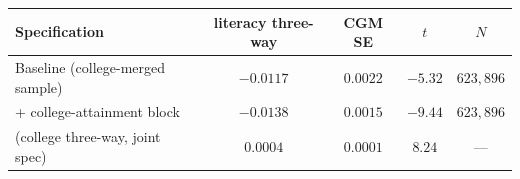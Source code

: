 \begin{tabular}{lcccc}
\hline\hline
Specification & literacy three-way & CGM SE & $t$ & $N$ \\
\hline
Baseline (college-merged sample) & $-0.0117$ & $0.0022$ & $-5.32$ & $623,896$ \\
\quad + college-attainment block & $-0.0138$ & $0.0015$ & $-9.44$ & $623,896$ \\
\hline
\quad (college three-way, joint spec) & $0.0004$ & $0.0001$ & $8.24$ & --- \\
\hline\hline
\end{tabular}
